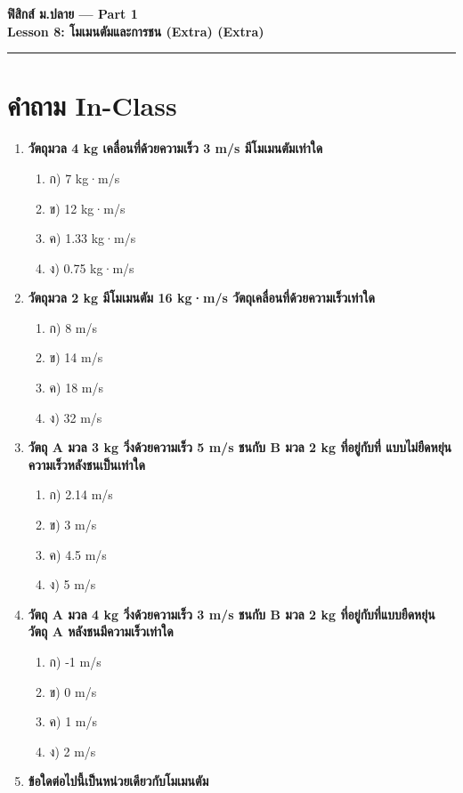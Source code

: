 \documentclass[12pt]{article}
\begin{document}
\begin{center}
{\LARGE\textbf{ฟิสิกส์ ม.ปลาย — Part 1}}\\[0.3em]
{\Large\textbf{Lesson 8: โมเมนตัมและการชน (Extra) (Extra)}}\\[0.5em]
\rule{0.8\linewidth}{0.5pt}
\end{center}
\section*{คำถาม In-Class}
\begin{enumerate}
\item \textbf{วัตถุมวล 4 kg เคลื่อนที่ด้วยความเร็ว 3 m/s มีโมเมนตัมเท่าใด}
\begin{enumerate}
\item ก) 7 kg·m/s
\item ข) 12 kg·m/s
\item ค) 1.33 kg·m/s
\item ง) 0.75 kg·m/s
\end{enumerate}
\item \textbf{วัตถุมวล 2 kg มีโมเมนตัม 16 kg·m/s วัตถุเคลื่อนที่ด้วยความเร็วเท่าใด}
\begin{enumerate}
\item ก) 8 m/s
\item ข) 14 m/s
\item ค) 18 m/s
\item ง) 32 m/s
\end{enumerate}
\item \textbf{วัตถุ A มวล 3 kg วิ่งด้วยความเร็ว 5 m/s ชนกับ B มวล 2 kg ที่อยู่กับที่ แบบไม่ยืดหยุ่น ความเร็วหลังชนเป็นเท่าใด}
\begin{enumerate}
\item ก) 2.14 m/s
\item ข) 3 m/s
\item ค) 4.5 m/s
\item ง) 5 m/s
\end{enumerate}
\item \textbf{วัตถุ A มวล 4 kg วิ่งด้วยความเร็ว 3 m/s ชนกับ B มวล 2 kg ที่อยู่กับที่แบบยืดหยุ่น วัตถุ A หลังชนมีความเร็วเท่าใด}
\begin{enumerate}
\item ก) -1 m/s
\item ข) 0 m/s
\item ค) 1 m/s
\item ง) 2 m/s
\end{enumerate}
\item \textbf{ข้อใดต่อไปนี้เป็นหน่วยเดียวกับโมเมนตัม}

\end{enumerate}
\end{document}
